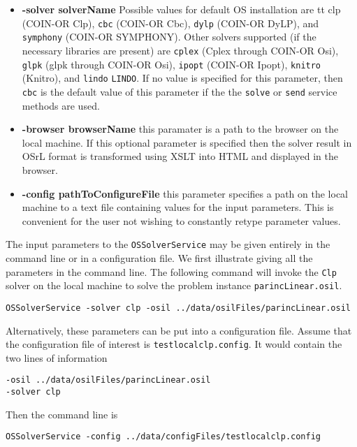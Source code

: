 \documentclass[11pt]{article}
\renewcommand{\_}{{\char"5F}}
\renewcommand{\{}{{\char"7B}}
\renewcommand{\}}{{\char"7D}}
\renewcommand{\^}{{\char"0D}}
\renewcommand{\'}{{\char"0D}}
\begin{document}
\begin{itemize}
\item[] {\bf -solver  solverName}  Possible values for default OS installation are {tt clp} (COIN-OR Clp), {\tt cbc} (COIN-OR Cbc), {\tt dylp} (COIN-OR DyLP), and {\tt symphony} (COIN-OR SYMPHONY). Other solvers supported (if the necessary libraries are present) are {\tt cplex} (Cplex through COIN-OR Osi), {\tt glpk} (glpk through COIN-OR Osi), {\tt ipopt} (COIN-OR Ipopt),  {\tt knitro} (Knitro), and {\tt lindo} {\tt LINDO}. If no value is specified for this parameter, then {\tt cbc} is the default value of this parameter if the the {\tt solve} or {\tt send} service methods are used.


\item[] {\bf -browser  browserName} this paramater is a path to the browser on the local machine. If this optional parameter is specified then the solver result in OSrL format is transformed using XSLT into HTML and displayed in the browser. 

\item[] {\bf -config pathToConfigureFile} this parameter specifies a path on the local machine to a text file containing values for the input parameters. This is convenient for the user not wishing to constantly retype parameter values.

\end{itemize}



The input parameters to the {\tt OSSolverService} may be given entirely in the command line or in a configuration file.  We first illustrate giving all the  parameters in the command line. The following command will invoke the {\tt Clp} solver on the local machine to solve the problem instance {\tt parincLinear.osil}.

\begin{verbatim}
OSSolverService -solver clp -osil ../data/osilFiles/parincLinear.osil 
\end{verbatim}

Alternatively, these parameters can be put into a configuration file. Assume that the configuration file of interest is {\tt testlocalclp.config}. It would contain the two lines of information
\begin{verbatim}
-osil ../data/osilFiles/parincLinear.osil
-solver clp
\end{verbatim}
Then the command line is
\begin{verbatim}
OSSolverService -config ../data/configFiles/testlocalclp.config
\end{verbatim}
\end{document}
